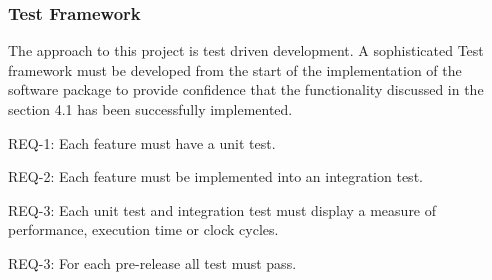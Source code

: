 \documentclass[]{report}
\begin{document}
\subsubsection{Test Framework}

The approach to this project is test driven development. A sophisticated Test framework must be developed from the start of the implementation of the software package to provide confidence that the functionality discussed in the section 4.1 has been successfully implemented. \par

REQ-1: Each feature must have a unit test. \par
REQ-2: Each feature must be implemented into an integration test. \par 
REQ-3: Each unit test and integration test must display a measure of performance, execution time or clock cycles. \par
REQ-3: For each pre-release all test must pass. \par

\pagebreak
\end{document}
